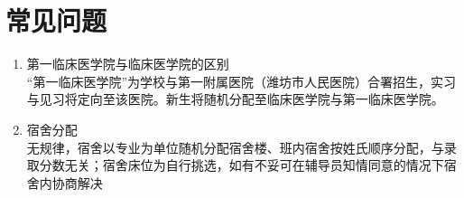\section[常见问题]{常见问题}
\begin{enumerate}
    \item 第一临床医学院与临床医学院的区别\\
          “第一临床医学院”为学校与第一附属医院（潍坊市人民医院）合署招生，实习与见习将定向至该医院。新生将随机分配至临床医学院与第一临床医学院。
    \item 宿舍分配\label{random_allocation}\\
          无规律，宿舍以专业为单位随机分配宿舍楼、班内宿舍按姓氏顺序分配，与录取分数无关；宿舍床位为自行挑选，如有不妥可在辅导员知情同意的情况下宿舍内协商解决
\end{enumerate}


